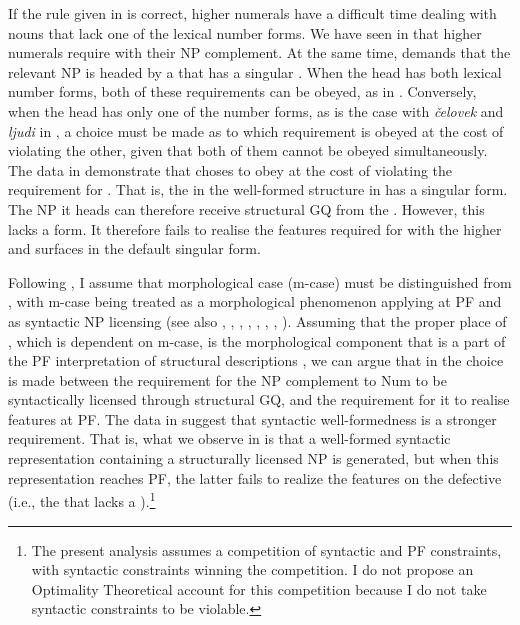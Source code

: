 \documentclass[output=paper,modfonts,newtxmath,hidelinks]{langscibook}
\begin{document}
\noindent If the rule given in  is correct,  higher numerals have a difficult time dealing with nouns that lack one of the lexical number forms. We have seen in  that higher numerals require  with their NP complement. At the same time,  demands that the relevant NP is headed by a  that has a singular . When the head  has both lexical number forms, both of these requirements can be obeyed, as in . Conversely, when the head  has only one of the number forms, as is the case with \textit{čelovek} and \textit{ljudi} in , a choice must be made as to which requirement is obeyed at the cost of violating the other, given that both of them cannot be obeyed simultaneously. The data in  demonstrate that  choses to obey  at the cost of violating the requirement for . That is, the  in the well-formed structure in  has a singular form. The NP it heads can therefore receive structural GQ from the . However, this  lacks a  form. It therefore fails to realise the   features required for  with the higher  and surfaces in the default  singular form.

Following \citet{Bobaljik2008}, I assume that morphological case (m-case) must be distinguished from , with m-case being treated as a morphological phenomenon applying at PF and  as syntactic NP licensing (see also \citealt{Harley1995}, \citealt{Marantz2000}, \citealt{McFadden2004}, \citealt{Schütze1997}, \citealt{Sigurðsson1991},  \citealt{Sigurðsson2003}, \citealt{Yip-etal1987}, \citealt{Zaenen-etal1985}). Assuming that the proper place of , which is dependent on m-case, is the morphological component that is a part of the PF interpretation of structural descriptions \citep{Bobaljik2008}, we can argue that in  the choice is made between the requirement for the NP complement to Num to be syntactically licensed through structural GQ, and the requirement for it to realise  features at PF. The data in  suggest that syntactic well-formedness is a stronger requirement. That is, what we observe in  is that a well-formed syntactic representation containing a structurally licensed NP is generated, but when this representation reaches PF, the latter fails to realize the   features on the defective  (i.e., the  that lacks a  ).\footnote{\label{18:fn6}The present analysis assumes a competition of syntactic and PF constraints, with syntactic constraints winning the competition. I do not propose an Optimality Theoretical account for this competition because I do not take syntactic constraints to be violable.}
\end{document}

